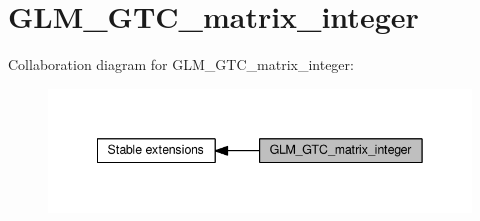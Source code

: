 \hypertarget{group__gtc__matrix__integer}{}\section{G\+L\+M\+\_\+\+G\+T\+C\+\_\+matrix\+\_\+integer}
\label{group__gtc__matrix__integer}
Collaboration diagram for G\+L\+M\+\_\+\+G\+T\+C\+\_\+matrix\+\_\+integer\+:
\nopagebreak
\begin{figure}[H]
\begin{center}
\leavevmode
\includegraphics[width=342pt]{dd/dd3/group__gtc__matrix__integer}
\end{center}
\end{figure}
